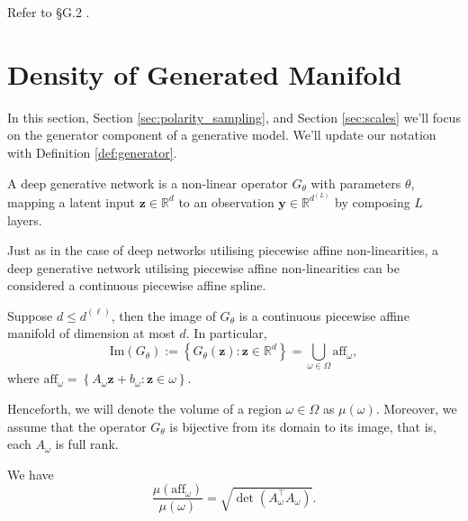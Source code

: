 \begin{tproof}
    Refer to \S G.2 \citet{balestrieroAnalyticalProbabilityDistributions2020}.
\end{tproof}

\section{Density of Generated Manifold}\label{sec:density_generated_manifold}

In this section, Section \ref{sec:polarity_sampling}, and Section \ref{sec:scales} we'll focus on the generator component of a generative model. We'll update our notation with Definition \ref{def:generator}.

\begin{definition}\label{def:generator}
    A deep generative network is a non-linear operator $G_{\theta}$ with parameters $\theta$, mapping a latent input $\mathbf{z}\in\mathbb{R}^d$ to an observation $\mathbf{y}\in\mathbb{R}^{d^{(L)}}$ by composing $L$ layers.
\end{definition}

\begin{remark}
    Just as in the case of deep networks utilising piecewise affine non-linearities, a deep generative network utilising piecewise affine non-linearities can be considered a continuous piecewise affine spline.
\end{remark}

Suppose $d\leq d^{(\ell)}$, then the image of $G_{\theta}$ is a continuous piecewise affine manifold of dimension at most $d$. In particular, $$\mathrm{Im}\left(G_{\theta}\right):=\left\{G_{\theta}(\mathbf{z}):\mathbf{z}\in\mathbb{R}^d\right\}=\bigcup_{\omega\in\Omega}\mathrm{aff}_{\omega},$$where $\mathrm{aff}_{\omega}=\left\{A_{\omega}\mathbf{z}+b_{\omega}:\mathbf{z}\in\omega\right\}$.

Henceforth, we will denote the volume of a region $\omega\in\Omega$ as $\mu(\omega)$. Moreover, we assume that the operator $G_{\theta}$ is bijective from its domain to its image, that is, each $A_{\omega}$ is full rank.

\begin{lemma}
    We have $$\frac{\mu\left(\mathrm{aff}_{\omega}\right)}{\mu(\omega)}=\sqrt{\det\left(A^{\top}_{\omega}A_{\omega}\right)}.$$
\end{lemma}

